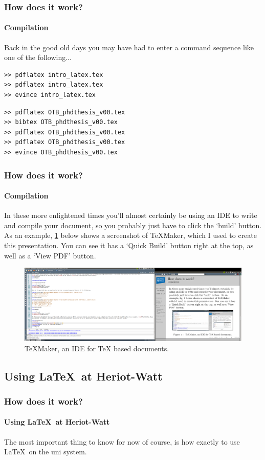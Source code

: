 \documentclass{beamer}
\begin{document}
\lstset{language=bash}

\begin{frame}[fragile]
\frametitle{How does it work?}
\framesubtitle{Compilation}

Back in the good old days you may have had to enter a command sequence like one of the following...

\begin{lstlisting}[caption={Command sequence for this presentation.}, label={lst:1}]
>> pdflatex intro_latex.tex
>> pdflatex intro_latex.tex
>> evince intro_latex.tex
\end{lstlisting}

\begin{lstlisting}[caption={Command sequence for a document containing BibTeX references.}, label={lst:2}]
>> pdflatex OTB_phdthesis_v00.tex
>> bibtex OTB_phdthesis_v00.tex
>> pdflatex OTB_phdthesis_v00.tex
>> pdflatex OTB_phdthesis_v00.tex
>> evince OTB_phdthesis_v00.tex
\end{lstlisting}

\end{frame}

\begin{frame}
\frametitle{How does it work?}
\framesubtitle{Compilation}

In these more enlightened times you'll almost certainly be using an IDE to write and compile your document, so you probably just have to click the `build' button. As an example, \cref{fig:1} below shows a screenshot of TeXMaker, which I used to create this presentation. You can see it has a `Quick Build' button right at the top, as well as a `View PDF' button. 

\begin{figure}[h!]
\centering
\includegraphics[width=0.9\linewidth]{texmaker_scrn}
\caption{TeXMaker, an IDE for TeX based documents.}
\label{fig:1}
\end{figure}

\end{frame}

\subsection[HWU]{Using \LaTeX\ at Heriot-Watt}
\begin{frame}
\frametitle{How does it work?}
\framesubtitle{Using \LaTeX\ at Heriot-Watt}
The most important thing to know for now of course, is how exactly to use \LaTeX\ on the uni system.
\end{frame}
\end{document}
